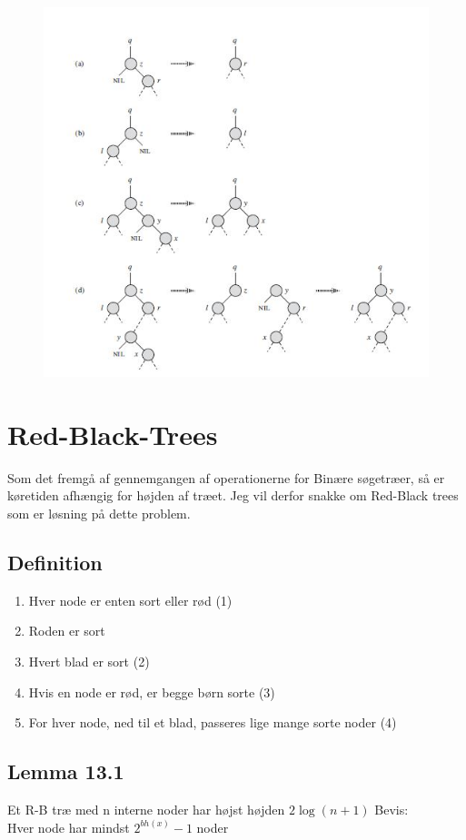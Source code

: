 \documentclass[11pt,a4paper]{report}
\theoremstyle{plain}
\theoremstyle{definition}
\theoremstyle{remark}
\numberwithin{equation}{section}
\begin{document}
\begin{figure}[H]
  \centering
  \includegraphics[scale=0.8]{delete.jpg}\\
  \caption{ }
\end{figure}

\section{Red-Black-Trees}
Som det fremgå af gennemgangen af operationerne for Binære søgetræer, så er køretiden afhængig for højden af træet. Jeg vil derfor snakke om Red-Black trees som er løsning på dette problem.
\subsection{Definition}

\begin{enumerate}
  \item Hver node er enten sort eller rød (1)
  \item Roden er sort
  \item Hvert blad er sort (2)
  \item Hvis en node er rød, er begge børn sorte (3)
  \item For hver node, ned til et blad, passeres lige mange sorte noder (4)
\end{enumerate}
\subsection{Lemma 13.1}
Et R-B træ med n interne noder har højst højden $2 \log(n+1)$
Bevis:\\
Hver node har mindst $2^{bh(x)}-1$ noder
\end{document}
